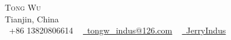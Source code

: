 \documentclass[10pt]{article}
\newcommand{\xfilll}[2][1ex]{
\dimen0=#2\advance\dimen0 by #1
\leaders\hrule height \dimen0 depth -#1\hfill}
\begin{document}
\begin{table}
    \begin{center}
    {\Huge \scshape Tong Wu} \\ \vspace{1pt}
    Tianjin, China\\ \vspace{3pt}
    \small \raisebox{-0.1\height}\faPhone\ +86 13820806614 ~ \href{mailto:yourmail@gmail.com}{\raisebox{-0.2\height}\faEnvelope\  \underline{tongw\_indus@126.com}} ~ 
    \href{https://github.com/JerryIndus}{\raisebox{-0.2\height}\faGithub\ \underline{JerryIndus}} ~     
    \vspace{-8pt}
\end{center}
\end{table}    

\setlength{\tabcolsep}{15pt} %



\end{document}
